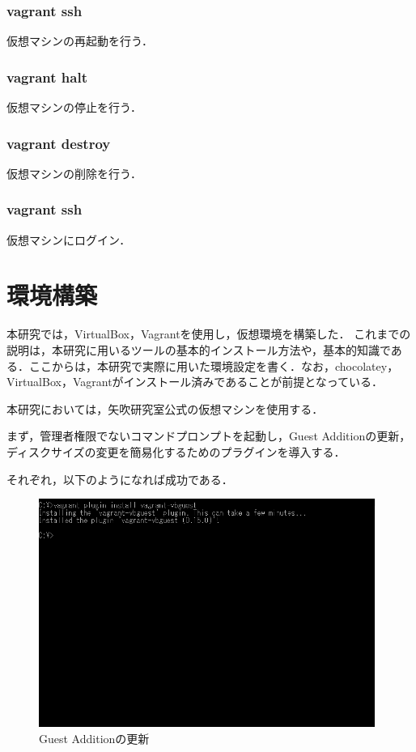 \subsubsection{vagrant ssh}
仮想マシンの再起動を行う．

\subsubsection{vagrant halt}
仮想マシンの停止を行う．

\subsubsection{vagrant destroy}
仮想マシンの削除を行う．

\subsubsection{vagrant ssh}
仮想マシンにログイン．
\newpage

\section{環境構築}
本研究では，VirtualBox，Vagrantを使用し，仮想環境を構築した．
これまでの説明は，本研究に用いるツールの基本的インストール方法や，基本的知識である．ここからは，本研究で実際に用いた環境設定を書く．なお，chocolatey，VirtualBox，Vagrantがインストール済みであることが前提となっている．

本研究においては，矢吹研究室公式の仮想マシンを使用する．

まず，管理者権限でないコマンドプロンプトを起動し，Guest Additionの更新，ディスクサイズの変更を簡易化するためのプラグインを導入する．
\newpage

それぞれ，以下のようになれば成功である．

\begin{figure}[htb]
\centering
\includegraphics[width=11cm]{4-17.png}
\caption{Guest Additionの更新}\label{4-17}
\end{figure}

